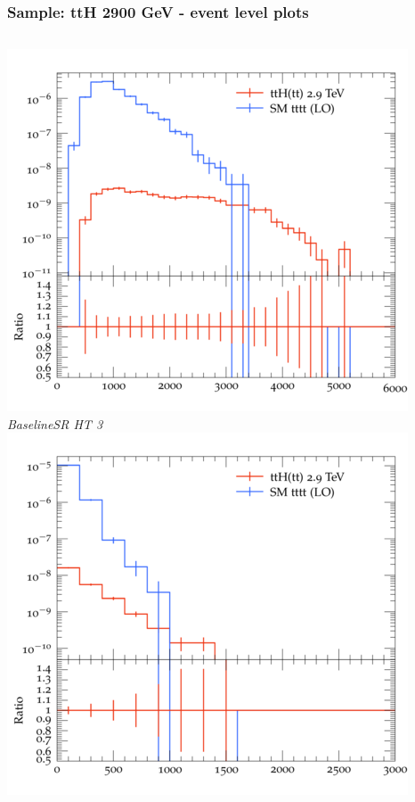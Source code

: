 \documentclass{beamer}
\begin{document}
\begin{frame}
\frametitle{Sample: ttH 2900 GeV - event level plots}
\begin{columns}
\includegraphics[width=\textwidth]{../plots/ttH_2900/tttt_ttH_1LOS/BaselineSR_HT_3.png}\\
\textit{\small BaselineSR HT 3}
\includegraphics[width=\textwidth]{../plots/ttH_2900/tttt_ttH_1LOS/BaselineSR_MET.png}\\

\end{columns}
\end{frame}
\end{document}
